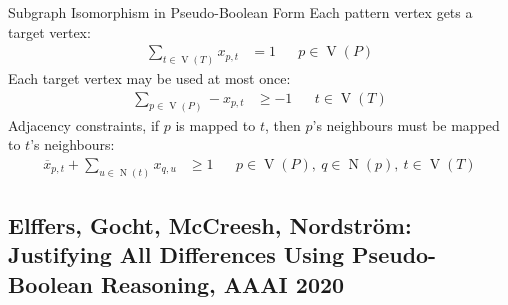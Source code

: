 \documentclass[aspectratio=169,compress,10pt]{beamer}
\newcommand{\neighbourhood}{\operatorname{N}}
\newcommand{\vertexset}{\operatorname{V}}
\begin{document}
\begin{frame}[t]{Subgraph Isomorphism in Pseudo-Boolean Form}
Each pattern vertex gets a target vertex: \begin{align*}
    \sum_{t \in \vertexset(T)} x_{p{,}t}  & = 1 && p \in \vertexset(P)
\end{align*}\pause
Each target vertex may be used at most once:\begin{align*}
    \sum_{p \in \vertexset(P)} -x_{p{,}t} & \ge -1 && t \in \vertexset(T)
\end{align*}\pause
Adjacency constraints, if $p$ is mapped to $t$, then $p$'s neighbours must
be mapped to $t$'s neighbours: \begin{align*}
    \overline{x}_{p{,}t} + \sum_{u \in \neighbourhood(t)} x_{q{,}u} & \ge 1 && p \in \vertexset(P),~q \in \neighbourhood(p),~t \in \vertexset(T)
\end{align*}
\end{frame}

\subsection{Elffers, Gocht, McCreesh, Nordstr\"om: Justifying All Differences Using Pseudo-Boolean Reasoning, AAAI 2020}
\end{document}
